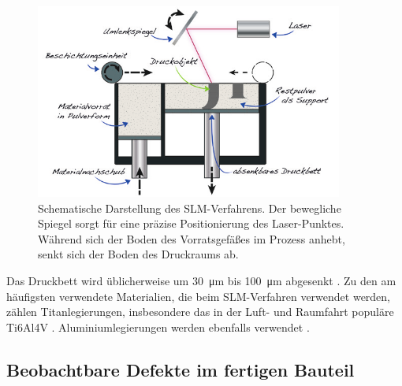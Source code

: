 		\begin{figure}[ht]
			\centering
			\includegraphics[width=0.9\textwidth]{chapter/main/img/sls_slm.png}
			\caption[Schematische Darstellung des SLM-Verfahrens]{Schematische Darstellung des
			SLM-Verfahrens. Der bewegliche Spiegel sorgt für eine präzise Positionierung des
			Laser-Punktes. Während sich der Boden des Vorrats\-gefäßes im Prozess anhebt, senkt
			sich der Boden des Druckraums ab. \cite[S. 119]{horsch20143d}}
			\label{fig:slm_sls}
		\end{figure}

		Das Druckbett wird üblicherweise um \SI{30}{\micro\meter} bis \SI{100}{\micro\meter}
		abgesenkt \cite{song2012effects}. Zu den am häufigsten verwendete Materialien, die beim
		SLM-Verfahren verwendet werden, zählen Titanlegierungen, insbesondere das in der Luft- und
		Raumfahrt populäre Ti6Al4V \cite{song2012effects,shi2016performance,brandl2012morphology}. %
		Aluminiumlegierungen werden ebenfalls verwendet
		\cite[je Al-Si-10Mg]{yan2020comparative,zou2017study}.

	\subsection{Beobachtbare Defekte im fertigen Bauteil}
